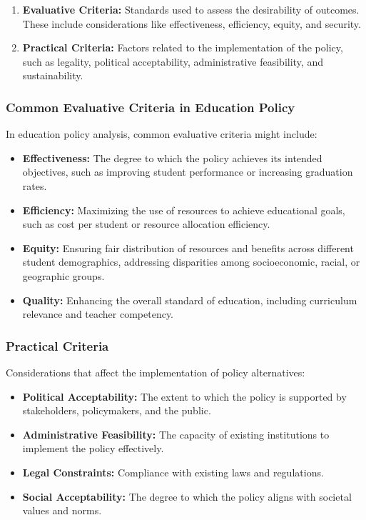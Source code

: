 \documentclass{article}
\theoremstyle{definition}
\theoremstyle{plain}
\begin{document}
\begin{enumerate}[label=\arabic*.]
    \item \textbf{Evaluative Criteria:} Standards used to assess the desirability of outcomes. These include considerations like effectiveness, efficiency, equity, and security.
    
    \item \textbf{Practical Criteria:} Factors related to the implementation of the policy, such as legality, political acceptability, administrative feasibility, and sustainability.
\end{enumerate} 


\subsubsection{Common Evaluative Criteria in Education Policy}

In education policy analysis, common evaluative criteria might include:

\begin{itemize}
    \item \textbf{Effectiveness:} The degree to which the policy achieves its intended objectives, such as improving student performance or increasing graduation rates.
    
    \item \textbf{Efficiency:} Maximizing the use of resources to achieve educational goals, such as cost per student or resource allocation efficiency.
    
    \item \textbf{Equity:} Ensuring fair distribution of resources and benefits across different student demographics, addressing disparities among socioeconomic, racial, or geographic groups.
    
    \item \textbf{Quality:} Enhancing the overall standard of education, including curriculum relevance and teacher competency.
\end{itemize}

\subsubsection{Practical Criteria}

Considerations that affect the implementation of policy alternatives:

\begin{itemize}
    \item \textbf{Political Acceptability:} The extent to which the policy is supported by stakeholders, policymakers, and the public.
    
    \item \textbf{Administrative Feasibility:} The capacity of existing institutions to implement the policy effectively.
    
    \item \textbf{Legal Constraints:} Compliance with existing laws and regulations.
    
    \item \textbf{Social Acceptability:} The degree to which the policy aligns with societal values and norms.
\end{itemize}
\end{document}
